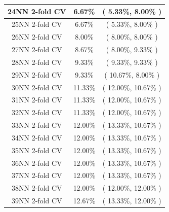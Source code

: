 \documentclass[11pt,a4paper]{article}
\begin{document}
\begin{center}
\begin{tabular} {|| c | c | c ||}
        24NN 2-fold CV & 6.67\% & ( 5.33\%, 8.00\% ) \\ \hline
        25NN 2-fold CV & 6.67\% & ( 5.33\%, 8.00\% ) \\ \hline
        26NN 2-fold CV & 8.00\% & ( 8.00\%, 8.00\% ) \\ \hline
        27NN 2-fold CV & 8.67\% & ( 8.00\%, 9.33\% ) \\ \hline
        28NN 2-fold CV & 9.33\% & ( 9.33\%, 9.33\% ) \\ \hline
        29NN 2-fold CV & 9.33\% & ( 10.67\%, 8.00\% ) \\ \hline
        30NN 2-fold CV & 11.33\% & ( 12.00\%, 10.67\% ) \\ \hline
        31NN 2-fold CV & 11.33\% & ( 12.00\%, 10.67\% ) \\ \hline
        32NN 2-fold CV & 11.33\% & ( 12.00\%, 10.67\% ) \\ \hline
        33NN 2-fold CV & 12.00\% & ( 13.33\%, 10.67\% ) \\ \hline
        34NN 2-fold CV & 12.00\% & ( 13.33\%, 10.67\% ) \\ \hline
        35NN 2-fold CV & 12.00\% & ( 13.33\%, 10.67\% ) \\ \hline
        36NN 2-fold CV & 12.00\% & ( 13.33\%, 10.67\% ) \\ \hline
        37NN 2-fold CV & 12.00\% & ( 13.33\%, 10.67\% ) \\ \hline
        38NN 2-fold CV & 12.00\% & ( 12.00\%, 12.00\% ) \\ \hline
        39NN 2-fold CV & 12.67\% & ( 13.33\%, 12.00\% ) \\ \hline 
    \end{tabular}
\end{center}
\newpage

\hypertarget{fiveFoldResultNorm}{}
\end{document}
